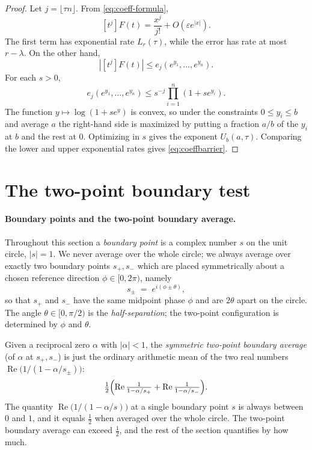 \documentclass[11pt]{article}
\newcommand{\eps}{\varepsilon}
\DeclareMathOperator{\Repart}{Re}
\begin{document}
\begin{proof}
Let $j=\lfloor\tau n\rfloor$.  From \eqref{eq:coeff-formula},
\[
        [t^j]F(t)=\frac{x^j}{j!}+O(\eps e^{|x|}).
\]
The first term has exponential rate $L_r(\tau)$, while the error has rate
at most $r-\lambda$.  On the other hand,
\[
        |[t^j]F(t)|\leq e_j(e^{y_1},\ldots,e^{y_n}).
\]
For each $s>0$,
\[
        e_j(e^{y_1},\ldots,e^{y_n})
        \leq s^{-j}\prod_{i=1}^n(1+se^{y_i}).
\]
The function $y\mapsto\log(1+se^y)$ is convex, so under the constraints
$0\leq y_i\leq b$ and average $a$ the right-hand side is maximized by
putting a fraction $a/b$ of the $y_i$ at $b$ and the rest at $0$.  Optimizing
in $s$ gives the exponent $U_b(a,\tau)$.  Comparing the lower and upper
exponential rates gives \eqref{eq:coeffbarrier}.
\end{proof}

\section{The two-point boundary test}

\paragraph{Boundary points and the two-point boundary average.}
Throughout this section a \emph{boundary point} is a complex number $s$ on
the unit circle, $|s|=1$.  We never average over the whole circle; we always
average over exactly two boundary points $s_+,s_-$ which are placed
symmetrically about a chosen reference direction
$\phi\in[0,2\pi)$, namely
\[
        s_\pm \;=\; e^{i(\phi\pm\theta)},
\]
so that $s_+$ and $s_-$ have the same midpoint phase $\phi$ and are $2\theta$
apart on the circle.  The angle $\theta\in[0,\pi/2)$ is the
\emph{half-separation}; the two-point configuration is determined by $\phi$
and $\theta$.

Given a reciprocal zero $\alpha$ with $|\alpha|<1$, the
\emph{symmetric two-point boundary average} (of $\alpha$ at $s_+,s_-$) is
just the ordinary arithmetic mean of the two real numbers
$\Repart\bigl(1/(1-\alpha/s_\pm)\bigr)$:
\[
        \tfrac12\Bigl(
                \Repart\tfrac{1}{1-\alpha/s_+}+
                \Repart\tfrac{1}{1-\alpha/s_-}
        \Bigr).
\]
The quantity $\Repart\bigl(1/(1-\alpha/s)\bigr)$ at a single boundary point
$s$ is always between $0$ and $1$, and it equals $\tfrac12$ when averaged
over the whole circle.  The two-point boundary average can exceed $\tfrac12$,
and the rest of the section quantifies by how much.
\end{document}

